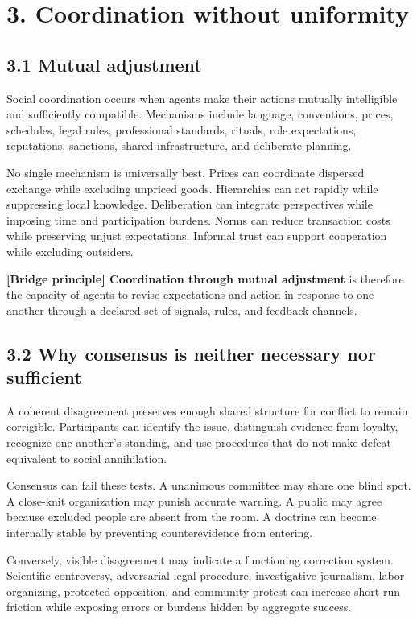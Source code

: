 \documentclass[
  11pt,
]{article}
\begin{document}
\section{3. Coordination without
uniformity}\label{coordination-without-uniformity}

\subsection{3.1 Mutual adjustment}\label{mutual-adjustment}

Social coordination occurs when agents make their actions mutually
intelligible and sufficiently compatible. Mechanisms include language,
conventions, prices, schedules, legal rules, professional standards,
rituals, role expectations, reputations, sanctions, shared
infrastructure, and deliberate planning.

No single mechanism is universally best. Prices can coordinate dispersed
exchange while excluding unpriced goods. Hierarchies can act rapidly
while suppressing local knowledge. Deliberation can integrate
perspectives while imposing time and participation burdens. Norms can
reduce transaction costs while preserving unjust expectations. Informal
trust can support cooperation while excluding outsiders.

\textbf{{[}Bridge principle{]} Coordination through mutual adjustment}
is therefore the capacity of agents to revise expectations and action in
response to one another through a declared set of signals, rules, and
feedback channels.

\subsection{3.2 Why consensus is neither necessary nor
sufficient}\label{why-consensus-is-neither-necessary-nor-sufficient}

A coherent disagreement preserves enough shared structure for conflict
to remain corrigible. Participants can identify the issue, distinguish
evidence from loyalty, recognize one another's standing, and use
procedures that do not make defeat equivalent to social annihilation.

Consensus can fail these tests. A unanimous committee may share one
blind spot. A close-knit organization may punish accurate warning. A
public may agree because excluded people are absent from the room. A
doctrine can become internally stable by preventing counterevidence from
entering.

Conversely, visible disagreement may indicate a functioning correction
system. Scientific controversy, adversarial legal procedure,
investigative journalism, labor organizing, protected opposition, and
community protest can increase short-run friction while exposing errors
or burdens hidden by aggregate success.
\end{document}

